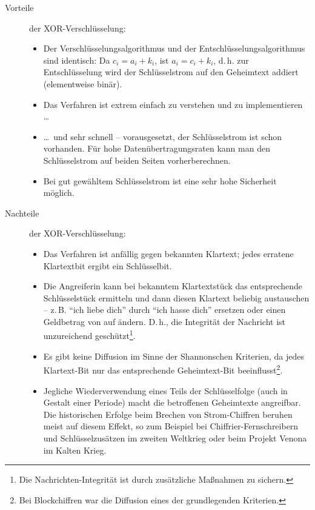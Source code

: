 \begin{refsegment}
\begin{description}
   \item[Vorteile] der XOR-Verschlüsselung:
      \begin{itemize}
         \item Der Verschlüsselungsalgorithmus und der
               Entschlüsselungsalgorithmus sind identisch: Da
               $c_i = a_i + k_i$, ist $a_i = c_i + k_i$, d.\,h. zur
               Entschlüsselung wird der Schlüsselstrom auf den Geheimtext
               addiert (elementweise binär).
         \item Das Verfahren ist extrem einfach zu verstehen und zu implementieren
               \ldots
         \item \ldots\, und sehr schnell -- vorausgesetzt, der
               Schlüsselstrom
               ist schon vorhanden. Für hohe Datenübertragungsraten kann
               man den Schlüsselstrom auf beiden Seiten vorherberechnen.
         \item Bei gut gewähltem Schlüsselstrom ist eine sehr hohe Sicherheit möglich.
      \end{itemize}
   \item[Nachteile] der XOR-Verschlüsselung:
      \begin{itemize}
         \item Das Verfahren ist anfällig gegen bekannten
               Klartext; jedes
               erratene Klartextbit ergibt ein Schlüsselbit.
         \item Die Angreiferin kann bei bekanntem Klartextstück das
               entsprechende Schlüsselstück ermitteln und dann diesen
               Klartext beliebig austauschen -- z.\,B. "`ich liebe dich"'
               durch "`ich hasse dich"' ersetzen oder einen Geldbetrag
               von  auf  ändern.
	       D.\,h., die Integrität der
               Nachricht ist unzureichend geschützt\footnote{%
                 Die Nachrichten-Integrität ist durch zusätzliche
		 Maßnahmen zu sichern.
	       }.
         \item Es gibt keine Diffusion im Sinne der Shannonschen Kriterien,
               da jedes Klartext-Bit nur das entsprechende Geheimtext-Bit beeinflusst\footnote{%
	         Bei Blockchiffren war die Diffusion eines der grundlegenden Kriterien.
	       }.
         \item Jegliche Wiederverwendung eines Teils der Schlüsselfolge
               (auch in Gestalt einer Periode) macht die betroffenen
               Geheimtexte angreifbar. Die historischen Erfolge beim
               Brechen von Strom-Chiffren beruhen meist auf diesem Effekt,
               so zum Beispiel bei Chiffrier-Fernschreibern und Schlüsselzusätzen
               im zweiten Weltkrieg oder beim Projekt Venona
               im Kalten Krieg.
      \end{itemize}
\end{description}


\end{refsegment}
